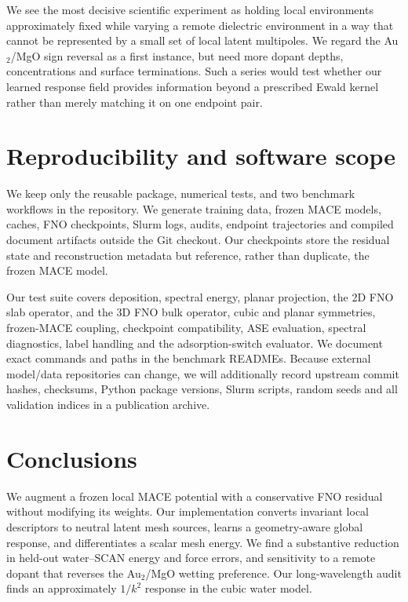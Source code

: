 \documentclass[11pt]{article}
\begin{document}
We see the most decisive scientific experiment as holding local environments
approximately fixed while varying a remote dielectric environment in a way
that cannot be represented by a small set of local latent multipoles. We
regard the Au$_2$/MgO sign reversal as a first instance, but need more dopant
depths, concentrations and surface terminations. Such a series would test
whether our learned response field provides information beyond a prescribed
Ewald kernel rather than merely matching it on one endpoint pair.

\section{Reproducibility and software scope}

We keep only the reusable package, numerical tests, and two benchmark
workflows in the repository. We generate training data, frozen MACE models,
caches, FNO checkpoints, Slurm logs, audits, endpoint trajectories and
compiled document artifacts outside the Git checkout. Our checkpoints store
the residual state and reconstruction metadata but reference, rather than
duplicate, the frozen MACE model.

Our test suite covers deposition, spectral energy, planar projection, the 2D
FNO slab operator, and the 3D FNO bulk operator,
cubic and planar symmetries, frozen-MACE coupling, checkpoint compatibility,
ASE evaluation, spectral diagnostics, label handling and the
adsorption-switch evaluator. We document exact commands and paths in the
benchmark READMEs. Because external model/data repositories can change, we
will additionally record upstream commit hashes, checksums, Python package
versions, Slurm scripts, random seeds and all validation indices in a
publication archive.

\section{Conclusions}

We augment a frozen local MACE potential with a conservative FNO residual
without modifying its weights. Our implementation converts invariant local
descriptors to neutral latent mesh sources, learns a geometry-aware global
response, and differentiates a scalar mesh energy. We find a substantive
reduction in held-out water--SCAN energy and force errors, and sensitivity to
a remote dopant that reverses the Au$_2$/MgO wetting preference. Our
long-wavelength audit finds an approximately \(1/k^2\) response in the cubic
water model.
\end{document}
